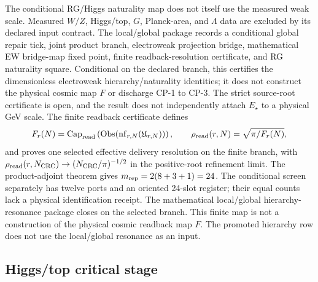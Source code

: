 \documentclass[11pt]{article}
\begin{document}
The conditional RG/Higgs naturality map does not itself use the measured weak scale. Measured \(W/Z\),
Higgs/top, \(G\), Planck-area, and \(\Lambda\) data are excluded by its declared input contract. The local/global package
records a conditional global repair tick, joint product branch, electroweak projection bridge,
mathematical EW bridge-map fixed point, finite readback-resolution certificate, and RG naturality
square. Conditional on the declared branch, this certifies the dimensionless electroweak hierarchy/naturality
identities; it does not construct the physical cosmic map \(F\) or discharge CP-1 to CP-3. The strict
source-root certificate is open, and the result does not independently attach
\(E_\star\) to a physical GeV scale. The finite readback certificate defines
\[
F_r(N)=\operatorname{Cap}_{\rm read}
\left(\operatorname{Obs}(\operatorname{nf}_{r,N}(\mathfrak U_{r,N}))\right),
\qquad
\rho_{\rm read}(r,N)=\sqrt{\pi/F_r(N)},
\]
and proves one selected effective delivery resolution on the finite branch, with
\(\rho_{\rm read}(r,N_{\rm CRC})\to(N_{\rm CRC}/\pi)^{-1/2}\) in the
positive-root refinement limit. The product-adjoint theorem gives
\(m_{\rm rep}=2(8+3+1)=24\). The conditional screen separately has twelve ports and an
oriented 24-slot register; their equal counts lack a physical identification receipt. The
mathematical local/global hierarchy-resonance package closes on the selected branch. This finite map
is not a construction of the physical cosmic readback map \(F\).
The promoted hierarchy row does not use the
local/global resonance as an input.

\subsection{Higgs/top critical stage}
\end{document}
